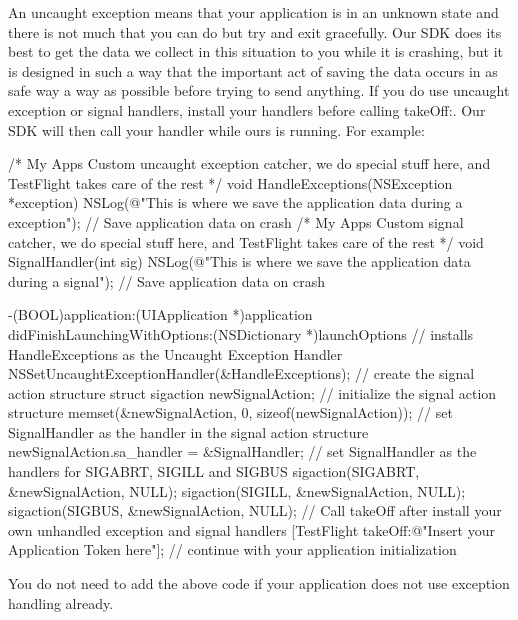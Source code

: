 An uncaught exception means that your application is in an unknown state and there is not much that you can do but try and exit gracefully. Our S\-D\-K does its best to get the data we collect in this situation to you while it is crashing, but it is designed in such a way that the important act of saving the data occurs in as safe way a way as possible before trying to send anything. If you do use uncaught exception or signal handlers, install your handlers before calling {\ttfamily take\-Off\-:}. Our S\-D\-K will then call your handler while ours is running. For example\-: \begin{DoxyVerb}  /*
   My Apps Custom uncaught exception catcher, we do special stuff here, and TestFlight takes care of the rest
  */
  void HandleExceptions(NSException *exception) {
    NSLog(@"This is where we save the application data during a exception");
    // Save application data on crash
  }
  /*
   My Apps Custom signal catcher, we do special stuff here, and TestFlight takes care of the rest
  */
  void SignalHandler(int sig) {
    NSLog(@"This is where we save the application data during a signal");
    // Save application data on crash
  }

  -(BOOL)application:(UIApplication *)application 
  didFinishLaunchingWithOptions:(NSDictionary *)launchOptions {    
    // installs HandleExceptions as the Uncaught Exception Handler
    NSSetUncaughtExceptionHandler(&HandleExceptions);
    // create the signal action structure 
    struct sigaction newSignalAction;
    // initialize the signal action structure
    memset(&newSignalAction, 0, sizeof(newSignalAction));
    // set SignalHandler as the handler in the signal action structure
    newSignalAction.sa_handler = &SignalHandler;
    // set SignalHandler as the handlers for SIGABRT, SIGILL and SIGBUS
    sigaction(SIGABRT, &newSignalAction, NULL);
    sigaction(SIGILL, &newSignalAction, NULL);
    sigaction(SIGBUS, &newSignalAction, NULL);
    // Call takeOff after install your own unhandled exception and signal handlers
    [TestFlight takeOff:@"Insert your Application Token here"];
    // continue with your application initialization
  }
\end{DoxyVerb}


You do not need to add the above code if your application does not use exception handling already. 